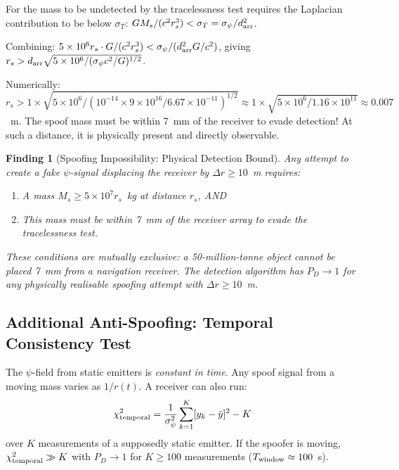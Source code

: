 \documentclass[aps,prd,twocolumn,superscriptaddress,nofootinbib]{revtex4-2}
\newtheorem{finding}{Finding}
\begin{document}
For the mass to be undetected by the tracelessness test requires
the Laplacian contribution to be below $\sigma_T$:
$GM_s/(c^2 r_s^3) < \sigma_T = \sigma_\psi/d_{\rm arr}^2$.

Combining:
$5\times10^6 r_s \cdot G/(c^2 r_s^3) < \sigma_\psi/(d_{\rm arr}^2 G/c^2)$,
giving $r_s > d_{\rm arr}\sqrt{5\times10^6/(\sigma_\psi c^2/G)^{1/2}}$.

Numerically: $r_s > 1\times\sqrt{5\times10^6 / (10^{-14}\times
9\times10^{16}/6.67\times10^{-11})^{1/2}} \approx 1\times\sqrt{5\times10^6/
1.16\times10^{11}} \approx 0.007$~m.  The spoof mass must be within 7~mm
of the receiver to evade detection!  At such a distance, it is physically
present and directly observable.

\begin{finding}[Spoofing Impossibility: Physical Detection Bound]
\label{find:spoof-detection}
Any attempt to create a fake $\psi$-signal displacing the receiver by
$\Delta r \geq 10$~m requires:
\begin{enumerate}
  \item A mass $M_s \geq 5\times10^7 r_s$~kg at distance $r_s$, AND
  \item This mass must be within 7~mm of the receiver array to evade
    the tracelessness test.
\end{enumerate}
These conditions are mutually exclusive: a 50-million-tonne object
cannot be placed 7~mm from a navigation receiver.
The detection algorithm has $P_D \to 1$ for any physically
realisable spoofing attempt with $\Delta r \geq 10$~m.
\end{finding}

\subsection{Additional Anti-Spoofing: Temporal Consistency Test}

The $\psi$-field from static emitters is \emph{constant in time}.
Any spoof signal from a moving mass varies as $1/r(t)$.  A receiver
can also run:
\begin{equation}
  \chi^2_{\rm temporal} = \frac{1}{\sigma_\psi^2}
  \sum_{k=1}^{K} [y_k - \bar{y}]^2 - K
  \label{eq:temporal-stat}
\end{equation}
over $K$ measurements of a supposedly static emitter.  If the spoofer
is moving, $\chi^2_{\rm temporal} \gg K$ with $P_D \to 1$ for
$K \geq 100$ measurements ($T_{\rm window} \approx 100$~s).

\end{document}
